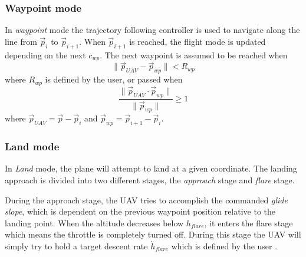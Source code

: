 \subsubsection{Waypoint mode}
In \textit{waypoint} mode the trajectory following controller is used
to navigate along the line from $\vec{p}_i$ to $\vec{p}_{i+1}$. When $\vec{p}_{i+1}$ is reached, the flight mode
is updated depending on the next $c_{wp}$. The next waypoint is assumed to be reached when
\begin{equation}
    \|\vec{p}_{UAV}-\vec{p}_{wp}\| < R_{wp}
\end{equation}
where $R_{wp}$ is defined by the user, or passed when
\begin{equation}
    \frac{\|\vec{p}_{UAV}\cdot \vec{p}_{wp}\|}{\|\vec{p}_{wp}\|}
     \geq 1
\end{equation}
where $\vec{p}_{UAV}=\vec{p}-\vec{p}_i$ and $\vec{p}_{wp}=\vec{p}_{i+1}-\vec{p}_i$.
\subsubsection{Land mode}
In \textit{Land} mode, the plane will attempt to land at a given coordinate. The landing approach 
is divided into two different stages, the \textit{approach} stage and \textit{flare} stage.

During the approach stage, the UAV tries to accomplish the commanded \textit{glide slope}, which is
dependent on the previous waypoint position relative to the landing point. When the altitude decreases
below $h_{flare}$, it enters the flare stage which means the throttle is completely turned off. 
During this stage the UAV will simply try to hold a target descent rate $\dot{h}_{flare}$ which is
defined by the user \cite{ardupilot_land}.